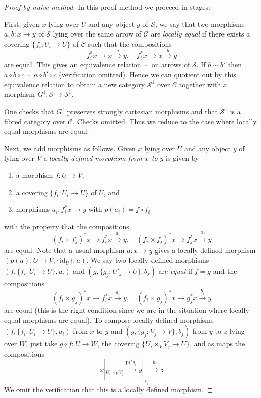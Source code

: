 \begin{proof}[Proof by naive method]
In this proof method we proceed in stages:

\medskip\noindent
First, given $x$ lying over $U$ and any object $y$ of
$\mathcal{S}$, we say that two morphisms
$a, b : x \to y$ of $\mathcal{S}$
lying over the same arrow of $\mathcal{C}$
are {\it locally equal}
if there exists a covering $\{f_i : U_i \to U\}$ of $\mathcal{C}$
such that the compositions
$$
f_i^*x \to x \xrightarrow{a} y,
\quad
f_i^*x \to x \xrightarrow{b} y
$$
are equal. This gives an equivalence relation $\sim$
on arrows of $\mathcal{S}$. If $b \sim b'$ then
$a \circ b \circ c \sim a \circ b' \circ c$ (verification omitted).
Hence we can quotient out by this equivalence relation to
obtain a new category $\mathcal{S}^1$ over $\mathcal{C}$
together with a morphism $G^1 : \mathcal{S} \to \mathcal{S}^1$.

\medskip\noindent
One checks that $G^1$ preserves strongly cartesian morphisms
and that $\mathcal{S}^1$ is a fibred category over $\mathcal{C}$.
Checks omitted. Thus we reduce to the case where locally equal
morphisms are equal.

\medskip\noindent
Next, we add morphisms as follows. Given
$x$ lying over $U$ and any object $y$ of lying over $V$
a {\it locally defined morphism from $x$ to $y$} is given by
\begin{enumerate}
\item a morphism $f : U \to V$,
\item a covering $\{f_i : U_i \to U\}$ of $U$, and
\item morphisms $a_i : f_i^*x \to y$ with $p(a_i) = f \circ f_i$
\end{enumerate}
with the property that the compositions
$$
(f_i \times f_j)^*x \to f_i^*x \xrightarrow{a_i} y,
\quad
(f_i \times f_j)^*x \to f_j^*x \xrightarrow{a_j} y
$$
are equal. Note that a usual morphism $a : x \to y$ gives a locally
defined morphism $(p(a) : U \to V, \{\text{id}_U\}, a)$.
We say two locally defined morphisms
$(f, \{f_i : U_i \to U\}, a_i)$ and $(g, \{g_j : U'_j \to U\}, b_j)$
are {\it equal} if $f = g$ and the compositions
$$
(f_i \times g_j)^*x \to f_i^*x \xrightarrow{a_i} y,
\quad
(f_i \times g_j)^*x \to g_j^*x \xrightarrow{b_j} y
$$
are equal (this is the right condition since we are in the
situation where locally equal morphisms are equal).
To compose locally defined morphisms
$(f, \{f_i : U_i \to U\}, a_i)$ from $x$ to $y$ and
$(g, \{g_j : V_j \to V\}, b_j)$ from $y$ to $z$ lying over $W$,
just take $g \circ f : U \to W$, the covering
$\{U_i \times_V V_j \to U\}$, and as maps the compositions
$$
x|_{U_i \times_V V_j}
\xrightarrow{\text{pr}_0^*a_i}
y|_{V_j}
\xrightarrow{b_j}
z
$$
We omit the verification that this is a locally defined morphism.


\end{proof}
